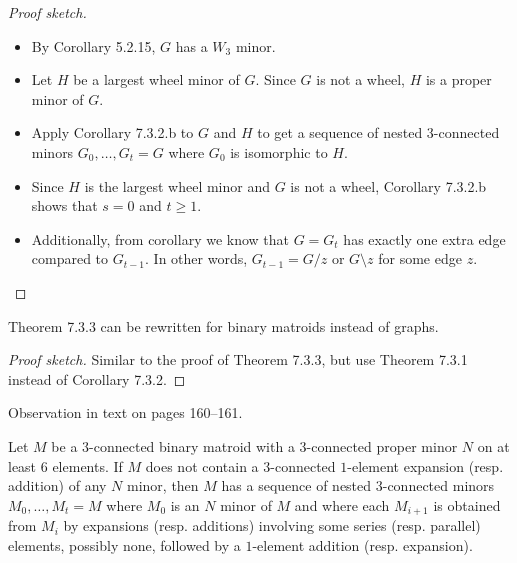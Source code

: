 \begin{proof}[Proof sketch]
  \begin{itemize}
    \item By Corollary 5.2.15, $G$ has a $W_{3}$ minor.
    \item Let $H$ be a largest wheel minor of $G$. Since $G$ is not a wheel, $H$ is a proper minor of $G$.
    \item Apply Corollary 7.3.2.b to $G$ and $H$ to get a sequence of nested $3$-connected minors $G_{0}, \dots, G_{t} = G$ where $G_{0}$ is isomorphic to $H$.
    \item Since $H$ is the largest wheel minor and $G$ is not a wheel, Corollary 7.3.2.b shows that $s = 0$ and $t \geq 1$.
    \item Additionally, from corollary we know that $G = G_{t}$ has exactly one extra edge compared to $G_{t - 1}$. In other words, $G_{t - 1} = G / z$ or $G \setminus z$ for some edge $z$.
  \end{itemize}
\end{proof}

\begin{theorem}
  \label{thm:7.3.3.binary}
  Theorem 7.3.3 can be rewritten for binary matroids instead of graphs.
\end{theorem}

\begin{proof}[Proof sketch]
  Similar to the proof of Theorem 7.3.3, but use Theorem 7.3.1 instead of Corollary 7.3.2.
\end{proof}

\begin{proposition}[7.3.4.observation]
  \label{prop:7.3.4.obs}
  Observation in text on pages 160--161.
\end{proposition}

\begin{theorem}[7.3.4]
  \label{thm:7.3.4}
  Let $M$ be a $3$-connected binary matroid with a $3$-connected proper minor $N$ on at least $6$ elements. If $M$ does not contain a $3$-connected $1$-element expansion (resp. addition) of any $N$ minor, then $M$ has a sequence of nested $3$-connected minors $M_{0}, \dots, M_{t} = M$ where $M_{0}$ is an $N$ minor of $M$ and where each $M_{i + 1}$ is obtained from $M_{i}$ by expansions (resp. additions) involving some series (resp. parallel) elements, possibly none, followed by a $1$-element addition (resp. expansion).
\end{theorem}

